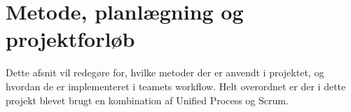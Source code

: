 \documentclass[../main.tex]{subfiles}
\begin{document}
\pagebreak

\section{Metode, planlægning og projektforløb} \label{metoder_p_p}
Dette afsnit vil redegøre for, hvilke metoder der er anvendt i projektet, og hvordan de er implementeret i teamets workflow. Helt overordnet er der i dette projekt blevet brugt en kombination af Unified Process og Scrum. 






\end{document}

